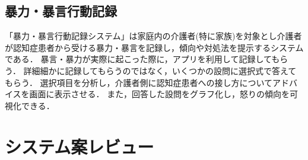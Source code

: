 \documentclass[../report]{subfiles}
\begin{document}
\subsection{暴力・暴言行動記録}
「暴力・暴言行動記録システム」は家庭内の介護者(特に家族)を対象とし介護者が認知症患者から受ける暴力・暴言を記録し，傾向や対処法を提示するシステムである．
暴言・暴力が実際に起こった際に，アプリを利用して記録してもらう．
詳細細かに記録してもらうのではなく，いくつかの設問に選択式で答えてもらう．
選択項目を分析し，介護者側に認知症患者への接し方についてアドバイスを画面に表示させる．
また，回答した設問をグラフ化し，怒りの傾向を可視化できる．


\section{システム案レビュー}
\end{document}
